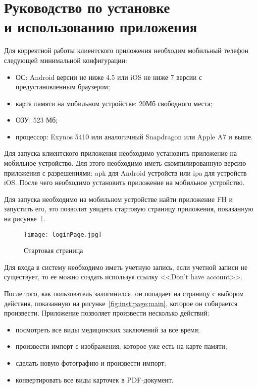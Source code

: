 \section{Руководство по установке\\ и использованию приложения}
\label{sec:inst}

Для корректной работы клиентского приложения необходим мобильный телефон следующей минимальной конфигурации:

\begin{itemize}
  \item ОС: Android версии не ниже 4.5 или iOS не ниже 7 версии с предустановленным браузером;
  \item карта памяти на мобильном устройстве: 20Мб свободного места;
  \item ОЗУ: 523 Мб;
  \item процессор: Exynos 5410 или аналогичный Snapdragon или Apple A7 и выше.
\end{itemize}

Для запуска клиентского приложения необходимо установить приложение на мобильное устройство. Для этого необходимо иметь скомпилированную версию приложения с разрешениями: apk для Android устройств или ipa для устройств iOS. После чего необходимо установить приложение на мобильное устройство. 

Для запуска необходимо на мобильном устройстве найти приложение FH и запустить его, это позволит увидеть стартовую страницу приложения, показанную на рисунке~\ref{fig:inst:page:login}.

\begin{figure}[ht]
\centering
  \texttt{[image: loginPage.jpg]}  
  \caption{Стартовая страница}
  \label{fig:inst:page:login}
\end{figure}

Для входа в систему необходимо иметь учетную запись, если учетной записи не существует, то ее можно создать используя ссылку <<Don't have account>>.

После того, как пользователь залогинился, он попадает на страницу с выбором действия, показанную на рисунке~\ref{fig:inst:page:main}, которое он собирается произвести. Приложение позволяет произвести несколько действий:
\begin{itemize}
  \item посмотреть все виды медицинских заключений за все время;
  \item произвести импорт с изображения, которое уже есть на карте памяти;
  \item сделать новую фотографию и произвести импорт;
  \item конвертировать все виды карточек в PDF-документ.
\end{itemize}

